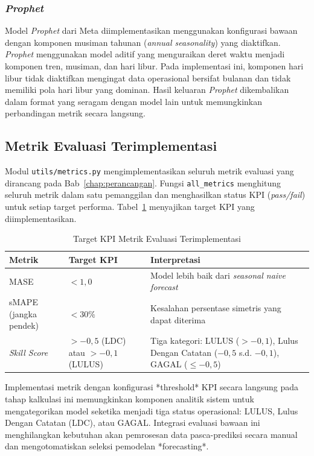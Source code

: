 \subsubsection{\textit{Prophet}}

Model \textit{Prophet} dari Meta diimplementasikan menggunakan konfigurasi bawaan dengan komponen musiman tahunan (\textit{annual seasonality}) yang diaktifkan. \textit{Prophet} menggunakan model aditif yang menguraikan deret waktu menjadi komponen tren, musiman, dan hari libur. Pada implementasi ini, komponen hari libur tidak diaktifkan mengingat data operasional bersifat bulanan dan tidak memiliki pola hari libur yang dominan. Hasil keluaran \textit{Prophet} dikembalikan dalam format yang seragam dengan model lain untuk memungkinkan perbandingan metrik secara langsung.

\subsection{Metrik Evaluasi Terimplementasi}

Modul \texttt{utils/metrics.py} mengimplementasikan seluruh metrik evaluasi yang dirancang pada Bab~\ref{chap:perancangan}. Fungsi \texttt{all\_metrics} menghitung seluruh metrik dalam satu pemanggilan dan menghasilkan status KPI (\textit{pass/fail}) untuk setiap target performa. Tabel~\ref{tab:metrik-kpi} menyajikan target KPI yang diimplementasikan.

\begin{table}[htbp]
\centering
\caption{Target KPI Metrik Evaluasi Terimplementasi}
\label{tab:metrik-kpi}
\begin{tabular}{|p{3.5cm}|p{3cm}|p{5.5cm}|}
\hline
\textbf{Metrik} & \textbf{Target KPI} & \textbf{Interpretasi} \\
\hline
MASE & $< 1{,}0$ & Model lebih baik dari \textit{seasonal naive forecast} \\
\hline
sMAPE (jangka pendek) & $< 30\%$ & Kesalahan persentase simetris yang dapat diterima \\
\hline
\textit{Skill Score} & $> -0{,}5$ (LDC) atau $> -0{,}1$ (LULUS) & Tiga kategori: LULUS ($>-0{,}1$), Lulus Dengan Catatan ($-0{,}5$ s.d. $-0{,}1$), GAGAL ($\leq -0{,}5$) \\
\hline
\end{tabular}
\end{table}

Implementasi metrik dengan konfigurasi *threshold* KPI secara langsung pada tahap kalkulasi ini memungkinkan komponen analitik sistem untuk mengategorikan model seketika menjadi tiga status operasional: LULUS, Lulus Dengan Catatan (LDC), atau GAGAL. Integrasi evaluasi bawaan ini menghilangkan kebutuhan akan pemrosesan data pasca-prediksi secara manual dan mengotomatiskan seleksi pemodelan *forecasting*.

